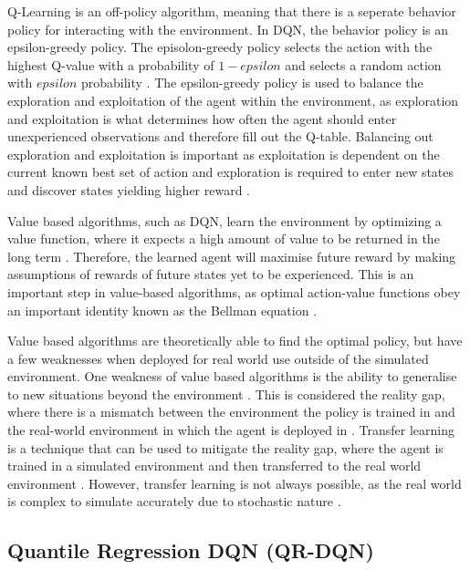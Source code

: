 Q-Learning is an off-policy algorithm, meaning that there is a seperate behavior policy for interacting with the environment. In DQN, the behavior policy is an epsilon-greedy policy. The episolon-greedy policy selects the action with the highest Q-value with a probability of $1 - epsilon$ and selects a random action with $epsilon$ probability \cite{TFAgentsAuthors2023}. The epsilon-greedy policy is used to balance the exploration and exploitation of the agent within the environment, as exploration and exploitation is what determines how often the agent should enter unexperienced observations and therefore fill out the Q-table. Balancing out exploration and exploitation is important as exploitation is dependent on the current known best set of  action and exploration is required to enter new states and discover states yielding higher reward \cite{TFAgentsAuthors2023}.

Value based algorithms, such as DQN, learn the environment by optimizing a value function, where it expects a high amount of value to be returned in the long term \cite{deepcheckRL}. Therefore, the learned agent will maximise future reward by making assumptions of rewards of future states yet to be experienced. This is an important step in value-based algorithms, as optimal action-value functions obey an important identity known as the Bellman equation \cite{mnih2013playing}. 

Value based algorithms are theoretically able to find the optimal policy, but have a few weaknesses when deployed for real world use outside of the simulated environment. One weakness of value based algorithms is the ability to generalise to new situations beyond the environment \cite{OdelTruxillo2023}. This is considered the reality gap, where there is a mismatch between the environment the policy is trained in and the real-world environment in which the agent is deployed in \cite{tobin2017domain}. Transfer learning is a technique that can be used to mitigate the reality gap, where the agent is trained in a simulated environment and then transferred to the real world environment \cite{OdelTruxillo2023}. However, transfer learning is not always possible, as the real world is complex to simulate accurately due to stochastic nature \cite{OdelTruxillo2023}. 

\subsection{Quantile Regression DQN (QR-DQN)}


